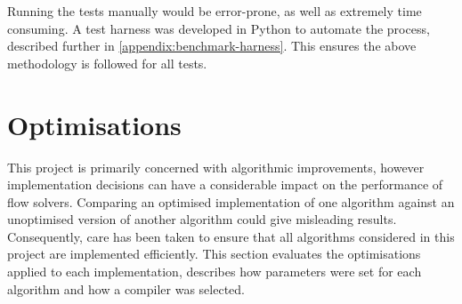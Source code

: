 Running the tests manually would be error-prone, as well as extremely time consuming. A test harness was developed in Python to automate the process, described further in \cref{appendix:benchmark-harness}. This ensures the above methodology is followed for all tests.




%
%

\section{Optimisations} \label{sec:eval-optimisations}

This project is primarily concerned with algorithmic improvements, however implementation decisions can have a considerable impact on the performance of flow solvers. Comparing an optimised implementation of one algorithm against an unoptimised version of another algorithm could give misleading results. Consequently, care has been taken to ensure that all algorithms considered in this project are implemented efficiently. This section evaluates the optimisations applied to each implementation, describes how parameters were set for each algorithm and how a compiler was selected.

